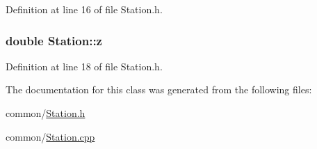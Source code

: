 Definition at line 16 of file Station.h.

\hypertarget{classStation_a4e9ba13f4bdfd32b9c8cfac08a4bf24a}{
\subsubsection[{z}]{\setlength{\rightskip}{0pt plus 5cm}double {\bf Station::z}}}
\label{classStation_a4e9ba13f4bdfd32b9c8cfac08a4bf24a}


Definition at line 18 of file Station.h.



The documentation for this class was generated from the following files:\begin{DoxyCompactItemize}
\item 
common/\hyperlink{Station_8h}{Station.h}\item 
common/\hyperlink{Station_8cpp}{Station.cpp}\end{DoxyCompactItemize}
